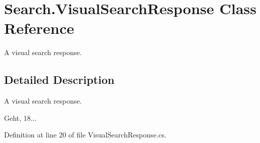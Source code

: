 \section{Search.\-Visual\-Search\-Response Class Reference}
\label{class_search_1_1_visual_search_response}


A visual search response.  




\subsection{Detailed Description}
A visual search response. 

Geht, 18... 

Definition at line 20 of file Visual\-Search\-Response.\-cs.

